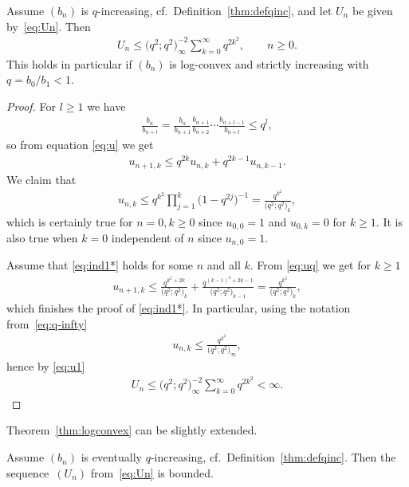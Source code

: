 \begin{thm}\label{thm:logconvex}Assume $(b_n)$ is $q$-increasing, cf.\ Definition~{\rm \ref{thm:defqinc}}, and let $U_n$ be given by~\eqref{eq:Un}. Then
 \begin{gather*}%
U_n\le \big(q^2;q^2\big)_\infty^{-2} \sum_{k=0}^{\infty}q^{2k^2},\qquad n\ge 0.
\end{gather*}
This holds in particular if $(b_n)$ is log-convex and strictly increasing with $q=b_0/b_1<1$.
\end{thm}

\begin{proof}For $l\ge 1$ we have
\begin{gather}\label{eq:logcv-q}
\frac{b_n}{b_{n+l}}=\frac{b_n}{b_{n+1}}\frac{b_{n+1}}{b_{n+2}}\cdots\frac{b_{n+l-1}}{b_{n+l}}\le q^l,
\end{gather}
 so from equation \eqref{eq:u} we get
\begin{gather}\label{eq:uq}
u_{n+1,k}\le q^{2k} u_{n,k}+q^{2k-1}u_{n,k-1}.
\end{gather}
We claim that
\begin{gather}\label{eq:ind1*}
u_{n,k}\le q^{k^2}\prod_{j=1}^k\big(1-q^{2j}\big)^{-1}=\frac{q^{k^2}}{\big(q^2;q^2\big)_k},
\end{gather}
which is certainly true for $n=0,k\ge 0$ since $u_{0,0}=1$ and $u_{0,k}=0$ for $k\ge 1$. It is also true when $k=0$ independent of $n$ since $u_{n,0}=1$.

Assume that \eqref{eq:ind1*} holds for some $n$ and all $k$. From \eqref{eq:uq} we get for $k\ge 1$
\begin{gather*}
u_{n+1,k}\le \frac{q^{k^2+2k}}{\big(q^2;q^2\big)_k}+\frac{q^{(k-1)^2+2k-1}}{\big(q^2;q^2\big)_{k-1}}=\frac{q^{k^2}}{\big(q^2;q^2\big)_k},
\end{gather*}
which finishes the proof of \eqref{eq:ind1*}. In particular, using the notation from~\eqref{eq:q-infty}
\begin{gather*}
u_{n,k}\le \frac{q^{k^2}}{\big(q^2;q^2\big)_\infty},
\end{gather*}
hence by \eqref{eq:u1}
\begin{gather*}
U_n\le \big(q^2;q^2\big)_\infty^{-2} \sum_{k=0}^{\infty}q^{2k^2}<\infty.\tag*{\qed}
\end{gather*}\renewcommand{\qed}{}
\end{proof}

Theorem~\ref{thm:logconvex} can be slightly extended.

\begin{thm}\label{thm:evtlogconvex} Assume $(b_n)$ is eventually $q$-increasing, cf.\ Definition~{\rm \ref{thm:defqinc}}. Then the sequen\-ce~$(U_n)$ from~\eqref{eq:Un} is bounded.
\end{thm}

